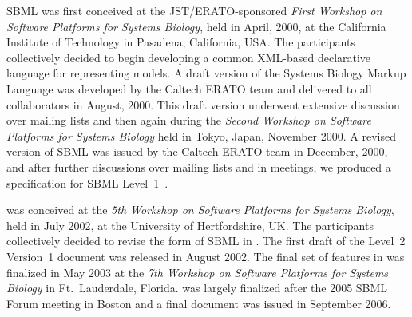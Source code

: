 SBML was first conceived at the JST/ERATO-sponsored \emph{First
  Workshop on Software Platforms for Systems Biology}, held in
April, 2000, at the California Institute of Technology in
Pasadena, California, USA.  The participants collectively decided
to begin developing a common XML-based declarative language for
representing models.  A draft version of the Systems Biology
Markup Language was developed by the Caltech ERATO team and
delivered to all collaborators in August, 2000.  This draft
version underwent extensive discussion over mailing lists and then
again during the \emph{Second Workshop on Software Platforms for
  Systems Biology} held in Tokyo, Japan, November 2000.  A revised
version of SBML was issued by the Caltech ERATO team in December,
2000, and after further discussions over mailing lists and in
meetings, we produced a specification for SBML
Level~1~\citep{hucka:2001}.

\sbmltwo was conceived at the \emph{5th Workshop on Software
  Platforms for Systems Biology}, held in July 2002, at the
University of Hertfordshire, UK.  The participants collectively
decided to revise the form of SBML in \sbmltwo.  The first draft
of the Level~2 Version~1 document was released in August 2002. The
final set of features in \sbmltwoone was finalized in May 2003 at
the \emph{7th Workshop on Software Platforms for Systems Biology}
in Ft.\ Lauderdale, Florida.  \sbmltwotwo was largely finalized
after the 2005 SBML Forum meeting in Boston and a final document
was issued in September 2006.

